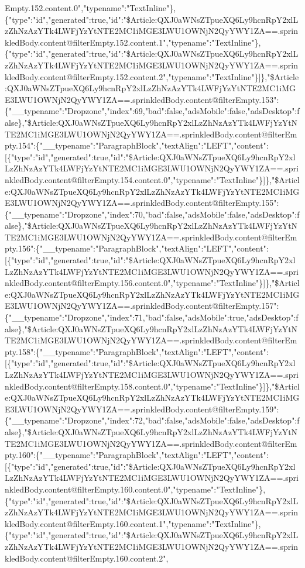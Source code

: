 Empty.152.content.0","typename":"TextInline"\},\{"type":"id","generated":true,"id":"\$Article:QXJ0aWNsZTpueXQ6Ly9hcnRpY2xlLzZhNzAzYTk4LWFjYzYtNTE2MC1iMGE3LWU1OWNjN2QyYWY1ZA==.sprinkledBody.content@filterEmpty.152.content.1","typename":"TextInline"\},\{"type":"id","generated":true,"id":"\$Article:QXJ0aWNsZTpueXQ6Ly9hcnRpY2xlLzZhNzAzYTk4LWFjYzYtNTE2MC1iMGE3LWU1OWNjN2QyYWY1ZA==.sprinkledBody.content@filterEmpty.152.content.2","typename":"TextInline"\}{]}\},"\$Article:QXJ0aWNsZTpueXQ6Ly9hcnRpY2xlLzZhNzAzYTk4LWFjYzYtNTE2MC1iMGE3LWU1OWNjN2QyYWY1ZA==.sprinkledBody.content@filterEmpty.153":\{"\_\_typename":"Dropzone","index":69,"bad":false,"adsMobile":false,"adsDesktop":false\},"\$Article:QXJ0aWNsZTpueXQ6Ly9hcnRpY2xlLzZhNzAzYTk4LWFjYzYtNTE2MC1iMGE3LWU1OWNjN2QyYWY1ZA==.sprinkledBody.content@filterEmpty.154":\{"\_\_typename":"ParagraphBlock","textAlign":"LEFT","content":{[}\{"type":"id","generated":true,"id":"\$Article:QXJ0aWNsZTpueXQ6Ly9hcnRpY2xlLzZhNzAzYTk4LWFjYzYtNTE2MC1iMGE3LWU1OWNjN2QyYWY1ZA==.sprinkledBody.content@filterEmpty.154.content.0","typename":"TextInline"\}{]}\},"\$Article:QXJ0aWNsZTpueXQ6Ly9hcnRpY2xlLzZhNzAzYTk4LWFjYzYtNTE2MC1iMGE3LWU1OWNjN2QyYWY1ZA==.sprinkledBody.content@filterEmpty.155":\{"\_\_typename":"Dropzone","index":70,"bad":false,"adsMobile":false,"adsDesktop":false\},"\$Article:QXJ0aWNsZTpueXQ6Ly9hcnRpY2xlLzZhNzAzYTk4LWFjYzYtNTE2MC1iMGE3LWU1OWNjN2QyYWY1ZA==.sprinkledBody.content@filterEmpty.156":\{"\_\_typename":"ParagraphBlock","textAlign":"LEFT","content":{[}\{"type":"id","generated":true,"id":"\$Article:QXJ0aWNsZTpueXQ6Ly9hcnRpY2xlLzZhNzAzYTk4LWFjYzYtNTE2MC1iMGE3LWU1OWNjN2QyYWY1ZA==.sprinkledBody.content@filterEmpty.156.content.0","typename":"TextInline"\}{]}\},"\$Article:QXJ0aWNsZTpueXQ6Ly9hcnRpY2xlLzZhNzAzYTk4LWFjYzYtNTE2MC1iMGE3LWU1OWNjN2QyYWY1ZA==.sprinkledBody.content@filterEmpty.157":\{"\_\_typename":"Dropzone","index":71,"bad":false,"adsMobile":true,"adsDesktop":false\},"\$Article:QXJ0aWNsZTpueXQ6Ly9hcnRpY2xlLzZhNzAzYTk4LWFjYzYtNTE2MC1iMGE3LWU1OWNjN2QyYWY1ZA==.sprinkledBody.content@filterEmpty.158":\{"\_\_typename":"ParagraphBlock","textAlign":"LEFT","content":{[}\{"type":"id","generated":true,"id":"\$Article:QXJ0aWNsZTpueXQ6Ly9hcnRpY2xlLzZhNzAzYTk4LWFjYzYtNTE2MC1iMGE3LWU1OWNjN2QyYWY1ZA==.sprinkledBody.content@filterEmpty.158.content.0","typename":"TextInline"\}{]}\},"\$Article:QXJ0aWNsZTpueXQ6Ly9hcnRpY2xlLzZhNzAzYTk4LWFjYzYtNTE2MC1iMGE3LWU1OWNjN2QyYWY1ZA==.sprinkledBody.content@filterEmpty.159":\{"\_\_typename":"Dropzone","index":72,"bad":false,"adsMobile":false,"adsDesktop":false\},"\$Article:QXJ0aWNsZTpueXQ6Ly9hcnRpY2xlLzZhNzAzYTk4LWFjYzYtNTE2MC1iMGE3LWU1OWNjN2QyYWY1ZA==.sprinkledBody.content@filterEmpty.160":\{"\_\_typename":"ParagraphBlock","textAlign":"LEFT","content":{[}\{"type":"id","generated":true,"id":"\$Article:QXJ0aWNsZTpueXQ6Ly9hcnRpY2xlLzZhNzAzYTk4LWFjYzYtNTE2MC1iMGE3LWU1OWNjN2QyYWY1ZA==.sprinkledBody.content@filterEmpty.160.content.0","typename":"TextInline"\},\{"type":"id","generated":true,"id":"\$Article:QXJ0aWNsZTpueXQ6Ly9hcnRpY2xlLzZhNzAzYTk4LWFjYzYtNTE2MC1iMGE3LWU1OWNjN2QyYWY1ZA==.sprinkledBody.content@filterEmpty.160.content.1","typename":"TextInline"\},\{"type":"id","generated":true,"id":"\$Article:QXJ0aWNsZTpueXQ6Ly9hcnRpY2xlLzZhNzAzYTk4LWFjYzYtNTE2MC1iMGE3LWU1OWNjN2QyYWY1ZA==.sprinkledBody.content@filterEmpty.160.content.2",
